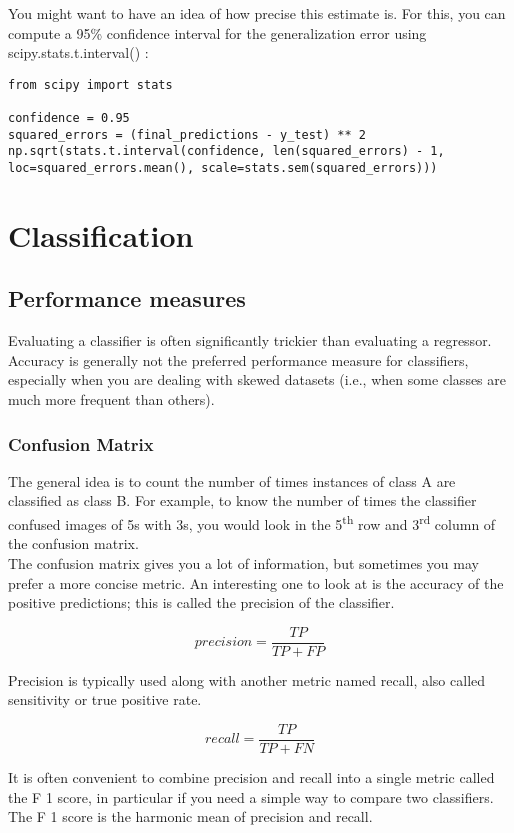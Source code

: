 \documentclass[french]{article}
\begin{document}
You might want to have an idea of how precise this estimate is.  For this, you can compute a 95\% confidence interval for the generalization error using scipy.stats.t.interval() :
\begin{lstlisting}
from scipy import stats

confidence = 0.95
squared_errors = (final_predictions - y_test) ** 2
np.sqrt(stats.t.interval(confidence, len(squared_errors) - 1, loc=squared_errors.mean(), scale=stats.sem(squared_errors)))
\end{lstlisting}

\section{Classification}

\subsection{Performance measures}

Evaluating a classifier is often significantly trickier than evaluating a regressor. Accuracy is generally not the preferred performance measure for classifiers, especially when you are dealing with skewed datasets (i.e., when some classes are much more frequent than others).

\subsubsection{Confusion Matrix}

The general idea is to count the number of times instances of class A are classified as class B. For example, to know the number of times the classifier confused images of 5s with 3s, you would look in the 5\textsuperscript{th} row and 3\textsuperscript{rd} column of the confusion matrix.\\

The confusion matrix gives you a lot of information, but sometimes you may prefer a more concise metric. An interesting one to look at is the accuracy of the positive predictions; this is called the precision of the classifier.

\[precision = \frac{TP}{TP + FP}\]

Precision is typically used along with another metric named recall, also called sensitivity or true positive rate.

\[recall = \frac{TP}{TP + FN}\]

It is often convenient to combine precision and recall into a single metric called the F 1 score, in particular if you need a simple way to compare two classifiers. The F 1 score is the harmonic mean of precision and recall.
\end{document}
